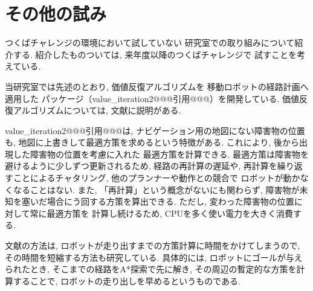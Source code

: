 \documentclass[twocolumn,9pt]{jsproceedings}
\begin{document}
\section{その他の試み}

つくばチャレンジの環境において試していない
研究室での取り組みについて紹介する. 
紹介したものついては, 来年度以降のつくばチャレンジで
試すことを考えている. 

当研究室では先述のとおり, 価値反復アルゴリズムを
移動ロボットの経路計画へ適用した
パッケージ（value\_iteration2@@@引用@@@）を開発している\cite{ueda2023JRM}. 
価値反復アルゴリズムについては, 
文献\cite{上田詳解}に説明がある. 

value\_iteration2@@@引用@@@は, 
ナビゲーション用の地図にない障害物の位置も, 
地図に上書きして最適方策を求めるという特徴がある. 
これにより, 後から出現した障害物の位置を考慮に入れた
最適方策を計算できる. 
最適方策は障害物を避けるように少しずつ更新されるため, 
経路の再計算の遅延や, 再計算を繰り返すことによるチャタリング, 
他のプランナーや動作との競合で
ロボットが動かなくなることはない. 
また, 「再計算」という概念がないにも関わらず, 
障害物が未知を塞いだ場合にう回する方策を算出できる. 
ただし, 変わった障害物の位置に対して常に最適方策を
計算し続けるため, CPUを多く使い電力を大きく消費する. 

文献\cite{ueda2023JRM}の方法は, 
ロボットが走り出すまでの方策計算に時間をかけてしまうので, 
その時間を短縮する方法も研究している\cite{中村2024}. 
具体的には, ロボットにゴールが与えられたとき, 
そこまでの経路をA*探索で先に解き, 
その周辺の暫定的な方策を計算することで, 
ロボットの走り出しを早めるというものである. 




\end{document}
